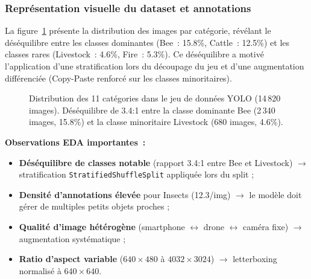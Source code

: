 \subsubsection{Représentation visuelle du dataset et annotations}

La figure~\ref{fig:yolo_hist} présente la distribution des images par catégorie,
révélant le déséquilibre entre les classes dominantes (Bee~: 15.8\%, Cattle~: 12.5\%)
et les classes rares (Livestock~: 4.6\%, Fire~: 5.3\%). Ce déséquilibre a motivé
l'application d'une stratification lors du découpage du jeu et d'une augmentation
différenciée (Copy-Paste renforcé sur les classes minoritaires).

\begin{figure}[H]
\centering
{}
\caption{Distribution des 11 catégories dans le jeu de données YOLO (14\,820 images).
Déséquilibre de 3.4:1 entre la classe dominante Bee (2\,340 images, 15.8\%)
et la classe minoritaire Livestock (680 images, 4.6\%).}
\label{fig:yolo_hist}
\end{figure}

\textbf{Observations EDA importantes~:}
\begin{itemize}
  \item \textbf{Déséquilibre de classes notable} (rapport 3.4:1 entre Bee et Livestock)
        $\rightarrow$ stratification \texttt{StratifiedShuffleSplit} appliquée lors du split ;
  \item \textbf{Densité d'annotations élevée} pour Insects (12.3/img) $\rightarrow$ le modèle
        doit gérer de multiples petits objets proches ;
  \item \textbf{Qualité d'image hétérogène} (smartphone $\leftrightarrow$ drone $\leftrightarrow$
        caméra fixe) $\rightarrow$ augmentation systématique ;
  \item \textbf{Ratio d'aspect variable} ($640\times480$ à $4032\times3024$)
        $\rightarrow$ letterboxing normalisé à $640\times640$.
\end{itemize}

